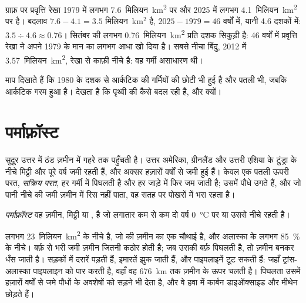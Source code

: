 \begin{example}[आर्कटिक की सितंबर की बर्फ़]
ग्राफ़ पर प्रवृत्ति रेखा 1979 में लगभग \num{7.6}~मिलियन~\unit{km^2} पर और 2025 में
लगभग \num{4.1}~मिलियन~\unit{km^2} पर है। बदलाव $7.6 - 4.1 =
3.5$ मिलियन~km$^2$
है, $2025 - 1979 = 46$ वर्षों में, यानी 4.6 दशकों में: $3.5 \div 4.6 \approx 0.76$।
सितंबर की  लगभग \num{0.76}~मिलियन~\unit{km^2} प्रति दशक सिकुड़ी है: 46
वर्षों में प्रवृत्ति रेखा ने अपने 1979 के मान का लगभग आधा खो दिया है। सबसे नीचा बिंदु,
2012 में \num{3.57}~मिलियन~\unit{km^2}, रेखा से काफ़ी नीचे है: वह गर्मी असाधारण
थी।
\end{example}

माप दिखाते हैं कि 1980 के दशक से आर्कटिक की गर्मियों की  छोटी भी हुई है और
पतली भी, जबकि आर्कटिक गरम हुआ है।  देखता है कि
पृथ्वी की  कैसे बदल रही है, और
क्यों।

\section{पर्माफ़्रॉस्ट}

सुदूर उत्तर में ठंड ज़मीन में गहरे तक पहुँचती है। उत्तर अमेरिका, ग्रीनलैंड और उत्तरी
एशिया के टुंड्रा के नीचे मिट्टी और  पूरे वर्ष जमी रहती हैं, और अक्सर हज़ारों वर्षों
से जमी हुई हैं। केवल एक पतली ऊपरी परत, \emph{सक्रिय परत}, हर गर्मी में पिघलती है और
हर जाड़े में फिर जम जाती है; उसमें पौधे उगते हैं, और जो पानी नीचे की जमी ज़मीन में रिस
नहीं पाता, वह सतह पर पोखरों में भरा रहता
है।

\begin{definition}[पर्माफ़्रॉस्ट]\label{def:g8:ice-on-earth:permafrost}
\emph{पर्माफ़्रॉस्ट} वह ज़मीन, मिट्टी या , है जो लगातार कम से
कम दो वर्ष \qty{0}{\degreeCelsius} पर या उससे नीचे रहती है।
\end{definition}

 लगभग \num{23}~मिलियन~\unit{km^2} के नीचे है, जो  की ज़मीन का
एक चौथाई है, और अलास्का के लगभग 85~\% के नीचे। बर्फ़ से भरी जमी ज़मीन  जितनी
कठोर होती है; जब उसकी बर्फ़ पिघलती है, तो ज़मीन  बनकर धँस जाती है। सड़कों में दरारें
पड़ती हैं, इमारतें झुक जाती हैं, और पाइपलाइनें टूट सकती हैं: जहाँ ट्रांस-अलास्का
पाइपलाइन  को पार करती है, वहाँ वह \qty{676}{km} तक ज़मीन के ऊपर चलती है।
पिघलता  उसमें हज़ारों वर्षों से जमे पौधों के अवशेषों को सड़ने भी देता है, और
वे हवा में कार्बन डाइऑक्साइड और मीथेन छोड़ते
हैं।


